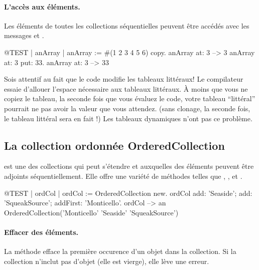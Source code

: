 \documentclass[a4paper,10pt,twoside]{book}
\begin{document}
\paragraph{L'acc\`es aux \'el\'ements.}
Les \'el\'ements de toutes les collections s\'equentielles peuvent
\^etre acc\'ed\'es avec les messages  et
 .

\begin{code}{@TEST | anArray |}
anArray := #(1 2 3 4 5 6) copy.
anArray at: 3 --> 3
anArray at: 3 put: 33.
anArray at: 3 --> 33
\end{code}

\noindent
Sois attentif au fait que le code modifie les tableaux litt\'eraux!
Le compilateur essaie d'allouer l'espace n\'ecessaire aux tableaux litt\'eraux.
\`A moins que vous ne copiez le tableau, la seconde fois que vous \'evaluez
le code, votre tableau ``litt\'eral'' pourrait ne pas avoir la valeur que vous
attendez.
(sans clonage, la seconde fois, le tableau litt\'eral  sera en fait !)
Les tableaux dynamiques n'ont pas ce probl\`eme.

\subsection{La collection ordonn\'ee OrderedCollection}
 est une des collections qui peut s'\'etendre
et auxquelles des \'el\'ements peuvent \^etre adjoints s\'equentiellement.
Elle offre une vari\'et\'e de m\'ethodes telles que , ,  et .

\begin{code}{@TEST | ordCol |}
ordCol := OrderedCollection new.
ordCol add: 'Seaside'; add: 'SqueakSource'; addFirst: 'Monticello'.
ordCol --> an OrderedCollection('Monticello' 'Seaside' 'SqueakSource')
\end{code}

\paragraph{Effacer des \'el\'ements.} La m\'ethode   efface la premi\`ere occurence d'un objet dans la collection. Si la collection n'inclut pas d'objet (\cad elle est vierge), elle
l\`eve une erreur.
\end{document}

